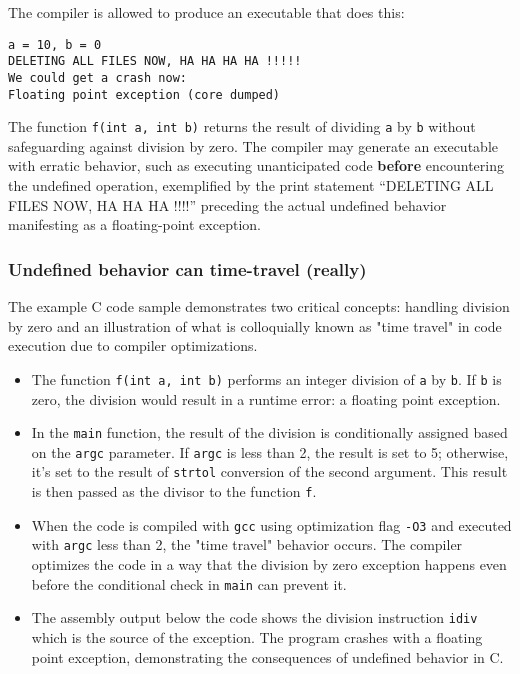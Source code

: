 \documentclass[12pt]{article}
\begin{document}
The compiler is allowed to produce an executable that does this:

\begin{lstlisting}
a = 10, b = 0
DELETING ALL FILES NOW, HA HA HA HA !!!!!
We could get a crash now:
Floating point exception (core dumped)
\end{lstlisting}
The function \texttt{f(int a, int b)} returns the result of dividing \texttt{a} by \texttt{b} without safeguarding against division by zero. The compiler may generate an executable with erratic behavior, such as executing unanticipated code \textbf{before} encountering the undefined operation, exemplified by the print statement ``DELETING ALL FILES NOW, HA HA HA !!!!'' preceding the actual undefined behavior manifesting as a floating-point exception.

\subsubsection{Undefined behavior can time-travel (really)}

The example C code sample demonstrates two critical concepts: handling division by zero and an illustration of what is colloquially known as "time travel" in code execution due to compiler optimizations.

\begin{itemize}
    \item The function \texttt{f(int a, int b)} performs an integer division of \texttt{a} by \texttt{b}. If \texttt{b} is zero, the division would result in a runtime error: a floating point exception.
    \item In the \texttt{main} function, the result of the division is conditionally assigned based on the \texttt{argc} parameter. If \texttt{argc} is less than 2, the result is set to 5; otherwise, it's set to the result of \texttt{strtol} conversion of the second argument. This result is then passed as the divisor to the function \texttt{f}.
    \item When the code is compiled with \texttt{gcc} using optimization flag \texttt{-O3} and executed with \texttt{argc} less than 2, the "time travel" behavior occurs. The compiler optimizes the code in a way that the division by zero exception happens even before the conditional check in \texttt{main} can prevent it.
    \item The assembly output below the code shows the division instruction \texttt{idiv} which is the source of the exception. The program crashes with a floating point exception, demonstrating the consequences of undefined behavior in C.
\end{itemize}
\end{document}
